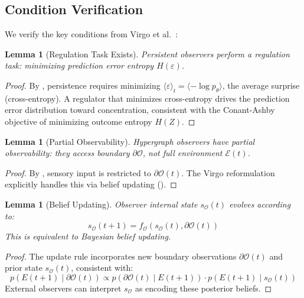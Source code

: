 \documentclass[11pt,a4paper]{article}
\theoremstyle{plain}
\newtheorem{lemma}[theorem]{Lemma}
\theoremstyle{definition}
\theoremstyle{remark}
\newcommand{\eps}{\varepsilon}
\newcommand{\Ocal}{\mathcal{O}}
\newcommand{\boundary}{\partial}
\begin{document}
\subsection{Condition Verification}

We verify the key conditions from Virgo et al.~\cite{virgo2025good}:

\begin{lemma}[Regulation Task Exists]
\label{lem:reg_task}
Persistent observers perform a regulation task: minimizing prediction error entropy $H(\eps)$.
\end{lemma}
\begin{proof}
By , persistence requires minimizing
$\langle \eps \rangle_t = \langle -\log p_\theta \rangle$, the average
surprise (cross-entropy). A regulator that minimizes cross-entropy drives
the prediction error distribution toward concentration, consistent with
the Conant-Ashby objective of minimizing outcome entropy $H(Z)$.
\end{proof}

\begin{lemma}[Partial Observability]
\label{lem:partial_obs}
Hypergraph observers have partial observability: they access boundary $\boundary \Ocal$, not full environment $\mathcal{E}(t)$.
\end{lemma}
\begin{proof}
By , sensory input is restricted to $\boundary \Ocal(t)$. The Virgo reformulation explicitly handles this via belief updating ().
\end{proof}

\begin{lemma}[Belief Updating]
\label{lem:belief_update}
Observer internal state $s_\Ocal(t)$ evolves according to:
\begin{equation}
s_\Ocal(t+1) = f_\Ocal(s_\Ocal(t), \boundary \Ocal(t))
\end{equation}
This is equivalent to Bayesian belief updating.
\end{lemma}
\begin{proof}
The update rule incorporates new boundary observations $\boundary \Ocal(t)$ and prior state $s_\Ocal(t)$, consistent with:
\begin{equation}
p(E(t+1) \mid \boundary \Ocal(t)) \propto p(\boundary \Ocal(t) \mid E(t+1)) \cdot p(E(t+1) \mid s_\Ocal(t))
\end{equation}
External observers can interpret $s_\Ocal$ as encoding these posterior beliefs.
\end{proof}
\end{document}
